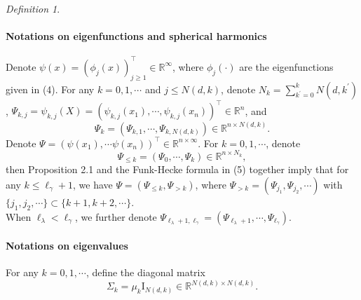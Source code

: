 \documentclass{article}
\theoremstyle{plain}
\theoremstyle{definition}
\theoremstyle{remark}
\newtheorem{definition}[theorem]{Definition}
\begin{document}
\begin{appendix}
\begin{definition}
\begin{itemize}
    \end{itemize}
\end{definition}












\paragraph*{Notations on eigenfunctions and spherical harmonics}
Denote $\psi(x) = (\phi_j(x))^{\top}_{j \ge 1} \in \mathbb{R}^{\infty}$, where $\phi_j(\cdot)$ are the eigenfunctions given in (4). For any $k =0, 1, \cdots$ and $j \leq N(d, k)$, denote $N_{k} = \sum_{k^{\prime}=0}^{k}N(d, k^{\prime})$, $ \Psi_{k, j} = \psi_{k,j}(X) = \left(\psi_{k,j}(x_{1}), \cdots, \psi_{k,j}(x_{n}) \right)^{\top} \in \mathbb{R}^{n}$, and
\begin{displaymath}
    \Psi_{k} = \left(\Psi_{k,1}, \cdots, \Psi_{k,N(d,k)} \right) \in \mathbb{R}^{n \times N(d,k)}.
\end{displaymath}
Denote $\Psi =  \left(\psi(x_{1}), \cdots \psi(x_{n}) \right)^{\top} \in \mathbb{R}^{n \times \infty}$. For $k =0, 1, \cdots$, denote 
$$
\Psi_{\leq k} = \left(\Psi_{0}, \cdots, \Psi_{k} \right) \in \mathbb{R}^{n \times N_{k}},
$$
then Proposition 2.1 and the Funk-Hecke formula in (5) together imply that for any $k \leq \ell_{\gamma}+1$, we have $\Psi = \left( \Psi_{\leq k}, \Psi_{>k} \right)$, where $\Psi_{>k} = \left(\Psi_{j_1}, \Psi_{j_2}, \cdots \right)$ with $\{j_1, j_2, \cdots\} \subset \{k+1, k+2, \cdots\}$.\\
When $\ell_{\lambda}<\ell_{\gamma}$, we further denote $\Psi_{\ell_{\lambda}+1, \ell_{\gamma}} = \left(\Psi_{\ell_{\lambda}+1}, \cdots, \Psi_{\ell_{\gamma}} \right)$.


\paragraph*{Notations on eigenvalues}
For any $k = 0, 1, \cdots$, define the diagonal matrix
\begin{displaymath}
    \Sigma_{k} = \mu_{k} \mathrm{I}_{N(d,k)} \in \mathbb{R}^{N(d,k) \times N(d,k)}.
\end{displaymath}


\end{appendix}
\end{document}
